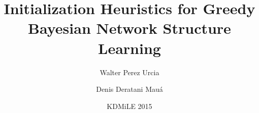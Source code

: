 \title[Greedy BN Structure Learning]{Initialization Heuristics for Greedy Bayesian Network Structure Learning}

\author[W. Perez \and D. Mauá]{
	Walter Perez Urcia \and
	Denis Deratani Mauá
}

\date[2015]{KDMiLE 2015}

\begin{frame}
	\titlepage
\end{frame}